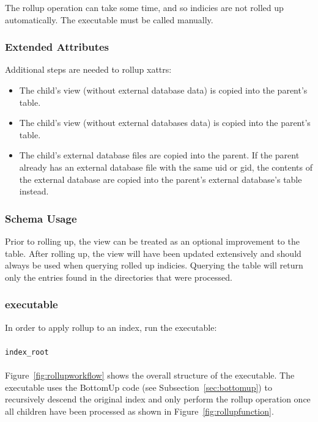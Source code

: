 The rollup operation can take some time, and so indicies are not
rolled up automatically. The \rollup executable must be called
manually.

\subsubsection{Extended Attributes}
Additional steps are needed to rollup xattrs:

\begin{itemize}
\item The child's \xattrsavail view (without external database data)
  is copied into the parent's \xattrsrollup table.
\item The child's \xattrfiles view (without external databases data)
  is copied into the parent's \xattrfilesrollup table.
\item The child's external database files are copied into the
  parent. If the parent already has an external database file with the
  same uid or gid, the contents of the external database are copied
  into the parent's external database's \xattrsrollup table instead.
\end{itemize}

\subsubsection{Schema Usage}
Prior to rolling up, the \pentries view can be treated as an optional
improvement to the \entries table. After rolling up, the \pentries view
will have been updated extensively and should always be used when
querying rolled up indicies. Querying the \entries table will return
only the entries found in the directories that were processed.

\subsubsection{\rollup executable}
In order to apply rollup to an index, run the \rollup executable:
\\\\
\indent \rollup \texttt{index\_root}
\\\\
Figure~\ref{fig:rollupworkflow} shows the overall structure of the \rollup
executable. The \rollup executable uses the BottomUp code (see
Subsection~\ref{sec:bottomup}) to recursively descend the original index and only
perform the rollup operation once all children have been processed as
shown in Figure~\ref{fig:rollupfunction}.

